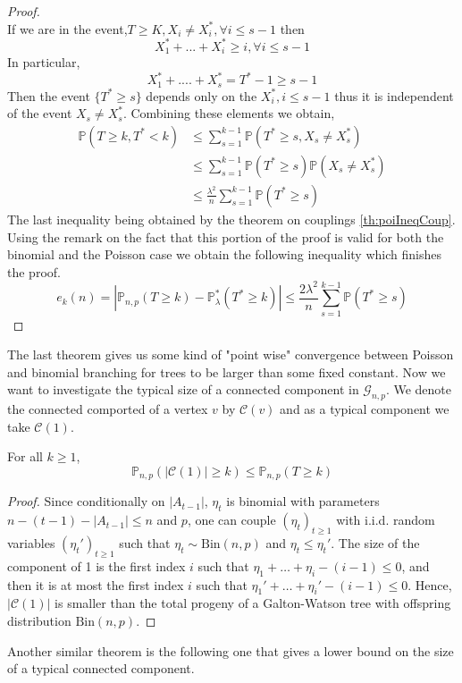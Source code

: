 \begin{proof}
\begin{equation}
	\end{equation}
	If we are in the event,$T \geq K, X_i \neq X_i^*, \forall i \leq s-1$ then
	\begin{equation}
		X_1^*+...+X_i^* \geq i, \forall i \leq s-1
	\end{equation}
	In particular,
	\begin{equation}
		X_1^*+....+X_s^* = T^* - 1 \geq s-1
	\end{equation}
	Then the event $\{T^* \geq s\}$ depends only on the $X_i^*, i\leq s-1$ thus it is independent of the event $X_s \neq X_s^*$.
	Combining these elements we obtain,
	\begin{align}
		\mathbb{P}(T\geq k, T^* < k) &\leq \sum_{s=1}^{k-1} \mathbb{P}(T^* \geq s, X_s \neq X_s^*) 	\\
					&\leq  \sum_{s=1}^{k-1} \mathbb{P}(T^* \geq s)\mathbb{P}(X_s \neq X_s^*) 	\\
					     &\leq  \frac{\lambda ^2}{n} \sum_{s=1}^{k-1} \mathbb{P}(T^* \geq s) 
	\end{align}
	The last inequality being obtained by the theorem on couplings \ref{th:poiIneqCoup}.
	Using the remark on the fact that this portion of the proof is valid for both the binomial and the Poisson case we obtain the following inequality which finishes the proof.
	\begin{equation}
		e_k(n) = |\mathbb{P}_{n, p}(T \geq k) -\mathbb{P}_{\lambda}^*(T^* \geq k)| \leq \frac{2\lambda ^2}{n}\sum_{s=1}^{k-1} \mathbb{P}(T^* \geq s)
	\end{equation}
\end{proof}
The last theorem gives us some kind of "point wise" convergence between Poisson and binomial branching for trees to be larger than some fixed constant.
\newline
Now we want to investigate the typical size of a connected component in $\mathcal{G}_{n,p}$. We denote the connected comported of a vertex $v$ by $\mathcal{C}(v)$ and as a typical component we take $\mathcal{C}(1)$.
\begin{theorem}
	For all $k\geq1$,
	\begin{equation}
		\mathbb{P}_{n,p}(|\mathcal{C}(1)| \geq k) \leq \mathbb{P}_{n,p}(T\geq k)
	\end{equation}
\end{theorem}
\begin{proof}
	Since conditionally on $|A_{t-1}|$, $\eta_t$ is binomial with parameters $n - (t-1) -|A_{t-1}| \leq n$ and $p$, 
	one can couple $(\eta_t)_{t \geq 1}$ with i.i.d. random variables $(\eta_t')_{t\geq 1}$ such that $\eta_t \sim \text{Bin}(n,p)$ and $\eta_t \leq \eta_t'$.
	\newline
	The size of the component of 1 is the first index $i$ such that $\eta_1 + \ldots + \eta_i - (i-1) \leq 0$, 
	and then it is at most the first index $i$ such that $\eta_1' + \ldots + \eta_i' - (i-1) \leq 0$.
	Hence, $|\mathcal{C}(1)|$ is smaller than the total progeny of a Galton-Watson tree with offspring distribution $\text{Bin}(n,p)$.
	\end{proof}
Another similar theorem is the following one that gives a lower bound on the size of a typical connected component.

